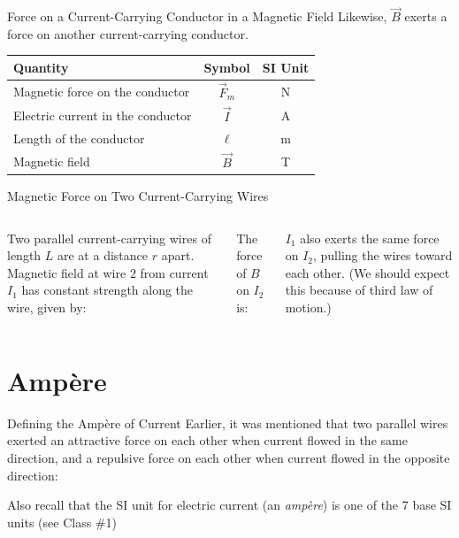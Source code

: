 \documentclass[12pt,aspectratio=169]{beamer}
\begin{document}
\begin{frame}{Force on a Current-Carrying Conductor in a Magnetic Field}
  Likewise, $\vec B$ exerts a force on another current-carrying conductor.

  \begin{center}
    \begin{tabular}{l|c|c}
      \rowcolor{pink}
      \textbf{Quantity} & \textbf{Symbol} & \textbf{SI Unit} \\ \hline
      Magnetic force on the conductor   & $\vec F_m$ & \si\newton \\
      Electric current in the conductor & $\vec I$   & \si\ampere \\
      Length of the conductor           & $\ell$     & \si\metre \\
      Magnetic field                    & $\vec B$   & \si\tesla
    \end{tabular}
  \end{center}
\end{frame}



\begin{frame}{Magnetic Force on Two Current-Carrying Wires}
  \begin{columns}

    Two parallel current-carrying wires of length $L$ are at a distance $r$
    apart. Magnetic field at wire $2$ from current $I_1$ has constant strength
    along the wire, given by:


    The force of $B$ on $I_2$ is:


    $I_1$ also exerts the same force on $I_2$, pulling the wires toward each
    other. (We should expect this because of third law of motion.)
  \end{columns}
\end{frame}



\section{Amp\`{e}re}

\begin{frame}{Defining the Amp\`{e}re of Current}
  Earlier, it was mentioned that two parallel wires exerted an attractive force
  on each other when current flowed in the same direction, and a repulsive
  force on each other when current flowed in the opposite direction:
  \begin{center}
  \end{center}
  \vspace{-.2in}Also recall that the SI unit for electric current (an
  \emph{amp\`{e}re}) is one of the 7 base SI units (see Class \#1)
\end{frame}
\end{document}
